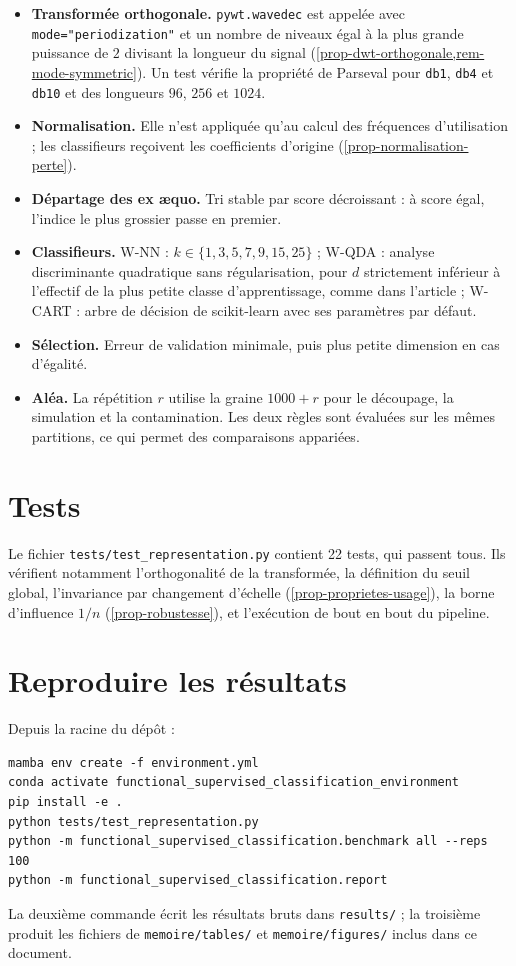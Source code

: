 \begin{itemize}
  \item \textbf{Transformée orthogonale.} \texttt{pywt.wavedec} est appelée avec \texttt{mode="periodization"} et un nombre de niveaux égal à la plus grande puissance de $2$ divisant la longueur du signal (\cref{prop-dwt-orthogonale,rem-mode-symmetric}). Un test vérifie la propriété de Parseval pour \texttt{db1}, \texttt{db4} et \texttt{db10} et des longueurs $96$, $256$ et $1024$.
  \item \textbf{Normalisation.} Elle n'est appliquée qu'au calcul des fréquences d'utilisation ; les classifieurs reçoivent les coefficients d'origine (\cref{prop-normalisation-perte}).
  \item \textbf{Départage des ex æquo.} Tri stable par score décroissant : à score égal, l'indice le plus grossier passe en premier.
  \item \textbf{Classifieurs.} W-NN : $k\in\{1,3,5,7,9,15,25\}$ ; W-QDA : analyse discriminante quadratique sans régularisation, pour $d$ strictement inférieur à l'effectif de la plus petite classe d'apprentissage, comme dans l'article ; W-CART : arbre de décision de scikit-learn avec ses paramètres par défaut.
  \item \textbf{Sélection.} Erreur de validation minimale, puis plus petite dimension en cas d'égalité.
  \item \textbf{Aléa.} La répétition $r$ utilise la graine $1000+r$ pour le découpage, la simulation et la contamination. Les deux règles sont évaluées sur les mêmes partitions, ce qui permet des comparaisons appariées.
\end{itemize}

\section{Tests}

Le fichier \texttt{tests/test\_representation.py} contient 22 tests, qui passent tous. Ils vérifient notamment l'orthogonalité de la transformée, la définition du seuil global, l'invariance par changement d'échelle (\cref{prop-proprietes-usage}), la borne d'influence $1/n$ (\cref{prop-robustesse}), et l'exécution de bout en bout du pipeline.

\section{Reproduire les résultats}

Depuis la racine du dépôt :
\begin{verbatim}
mamba env create -f environment.yml
conda activate functional_supervised_classification_environment
pip install -e .
python tests/test_representation.py
python -m functional_supervised_classification.benchmark all --reps 100
python -m functional_supervised_classification.report
\end{verbatim}
La deuxième commande écrit les résultats bruts dans \texttt{results/} ; la troisième produit les fichiers de \texttt{memoire/tables/} et \texttt{memoire/figures/} inclus dans ce document.


\cleardoublepage
{}
{}
\printbibliography[title={Bibliographie}]


